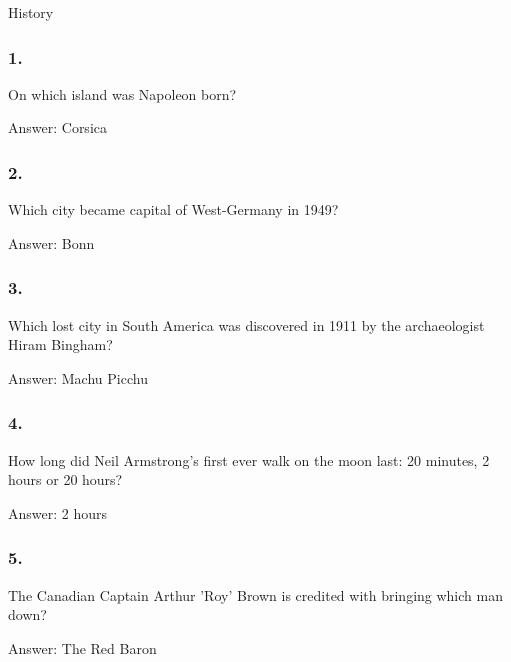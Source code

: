 \documentclass{beamer}
\begin{document}
    \begin{frame}
        \begin{center}
            \Huge History
        \end{center}
    \end{frame}

    \begin{frame}
        \frametitle{1.}
        On which island was Napoleon born?\\

        \begin{center}
            Answer: Corsica
        \end{center}
    \end{frame}

    \begin{frame}
        \frametitle{2.}
        Which city became capital of West-Germany in 1949?\\

        \begin{center}
            Answer: Bonn
        \end{center}
    \end{frame}

    \begin{frame}
        \frametitle{3.}
        Which lost city in South America was discovered in 1911 by the
        archaeologist Hiram Bingham?\\

        \begin{center}
            Answer: Machu Picchu
        \end{center}
    \end{frame}

    \begin{frame}
        \frametitle{4.}
        How long did Neil Armstrong’s first ever walk on the moon last: 20
        minutes, 2 hours or 20 hours?\\

        \begin{center}
            Answer: 2 hours
        \end{center}
    \end{frame}

    \begin{frame}
        \frametitle{5.}
        The Canadian Captain Arthur 'Roy' Brown is credited with bringing
        which man down?\\

        \begin{center}
            Answer: The Red Baron
        \end{center}
    \end{frame}
\end{document}
